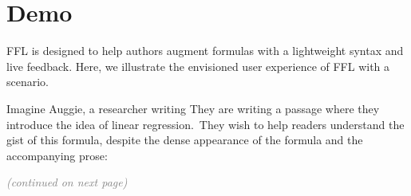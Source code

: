 \section{Demo}\label{Demo}

FFL is designed to help authors augment formulas with a lightweight syntax and live feedback. Here, we illustrate the envisioned user experience of FFL with a scenario.

Imagine Auggie, a researcher writing  They are writing a passage where they introduce the idea of linear regression.\footnotemark\ They wish to help readers understand the gist of this formula, despite the dense appearance of the formula and the accompanying prose: \\[1ex]
\ifreview
\else
\centerline{\vspace{3ex}\textcolor{gray}{\textit{(continued on next page)}}}
\vfill\pagebreak
\fi
{} 


